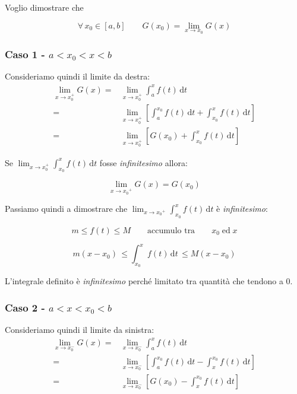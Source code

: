\documentclass[../dimostrazioni]{subfiles}
\begin{document}
                Voglio dimostrare che 

                \[\forall \, x_0 \in [a, b] \qquad G(x_0) = \lim_{x \to  x_0} G(x) \]
            
                \subsubsection*{Caso 1 - \(a < x_0 < x < b \)}

                    Consideriamo quindi il limite da destra:
                    \begin{align*}
                        \lim_{x \to x_0^+} G(x) =& \lim_{x \to x_0^+} \int_a^x \! f(t) \, \mathrm{d}t\\
                        =& \lim_{x \to x_0^+} \left[ \int_a^{x_0} \! f(t) \, \mathrm{d}t + \int_{x_0}^x \! f(t) \, \mathrm{d}t \right]\\
                        =& \lim_{x \to x_0^+} \left[ G(x_0) + \int_{x_0}^x \! f(t) \, \mathrm{d}t \right]
                    \end{align*}

                    Se \( \lim_{x \to x_0^+} \int_{x_0}^x \! f(t) \, \mathrm{d}t \) fosse \emph{infinitesimo} allora:

                    \[  \lim_{x \to {x_0}^{+}}G(x) = G(x_0) \]

                    Passiamo quindi a dimostrare che \( \lim_{x \to {x_0}^{+}} \int_{x_0}^x \! f(t) \, \mathrm{d}t \) è \emph{infinitesimo}:

                    \[m \leqslant f(t) \leqslant M \qquad \text {accumulo tra} \qquad x_0 \; \text{ed} \; x \]

                    \[m(x-x_0) \, \leqslant \int_{x_0}^x \! f(t) \, \mathrm{d}t \, \leqslant M(x-x_0) \]

                    L'integrale definito è \emph{infinitesimo} perché limitato tra quantità che tendono a 0.

                \subsubsection*{Caso 2 - \(a < x < x_0 < b \)}

                    Consideriamo quindi il limite da sinistra:
                    \begin{align*}
                        \lim_{x \to x_0^-} G(x) =& \lim_{x \to x_0^-} \int_a^x \! f(t) \, \mathrm{d}t\\
                        =& \lim_{x \to x_0^-} \left[ \int_a^{x_0} \! f(t) \, \mathrm{d}t - \int_x^{x_0} \! f(t) \, \mathrm{d}t \right]\\
                        =& \lim_{x \to x_0^-} \left[ G(x_0) - \int_x^{x_0} \! f(t) \, \mathrm{d}t \right]
                    \end{align*}
\end{document}
